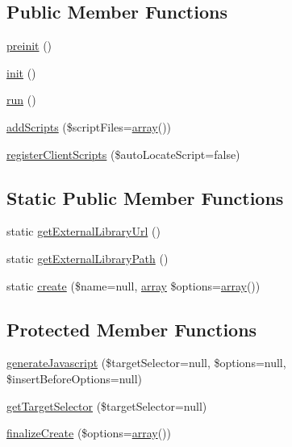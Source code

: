 \subsection*{Public Member Functions}
\begin{DoxyCompactItemize}
\item 
\hyperlink{classCPSjQueryWidget_a2dc262e99b1c246b56f27626bfe699ff}{preinit} ()
\item 
\hyperlink{classCPSjQueryWidget_a4be4055f3361d4800e16bc2e2e38cda6}{init} ()
\item 
\hyperlink{classCPSjQueryWidget_afb0fafe7e02a3ae1993c01c19fad2bae}{run} ()
\item 
\hyperlink{classCPSjQueryWidget_a306c665c2f2c3dafd10fece0819a92c7}{addScripts} (\$scriptFiles=\hyperlink{list_8php_aa3205d038c7f8feb5c9f01ac4dfadc88}{array}())
\item 
\hyperlink{classCPSjQueryWidget_a79bf828ed852174a56c4db5ef918a83c}{registerClientScripts} (\$autoLocateScript=false)
\end{DoxyCompactItemize}
\subsection*{Static Public Member Functions}
\begin{DoxyCompactItemize}
\item 
static \hyperlink{classCPSjQueryWidget_a6895766aa3c57450dc1789f26f5d97cf}{getExternalLibraryUrl} ()
\item 
static \hyperlink{classCPSjQueryWidget_a4d8ef7a7a3e6642bb8eb79a492861009}{getExternalLibraryPath} ()
\item 
static \hyperlink{classCPSjQueryWidget_af09cbabc6ce2c1d9d9efb7ae308ea0f3}{create} (\$name=null, \hyperlink{list_8php_aa3205d038c7f8feb5c9f01ac4dfadc88}{array} \$options=\hyperlink{list_8php_aa3205d038c7f8feb5c9f01ac4dfadc88}{array}())
\end{DoxyCompactItemize}
\subsection*{Protected Member Functions}
\begin{DoxyCompactItemize}
\item 
\hyperlink{classCPSjQueryWidget_ad50ca154583f36f93de20c14bc472209}{generateJavascript} (\$targetSelector=null, \$options=null, \$insertBeforeOptions=null)
\item 
\hyperlink{classCPSjQueryWidget_aade1c4e4e613582e076dcf713557b390}{getTargetSelector} (\$targetSelector=null)
\item 
\hyperlink{classCPSjQueryWidget_af539af80a97e9e1ad09105bcfc38551e}{finalizeCreate} (\$options=\hyperlink{list_8php_aa3205d038c7f8feb5c9f01ac4dfadc88}{array}())
\end{DoxyCompactItemize}


